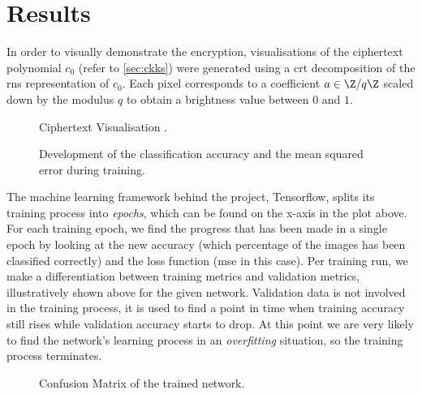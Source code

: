 \chapter{Results}
\label{chap:results}
In order to visually demonstrate the encryption, visualisations of the ciphertext polynomial $c_0$ (refer to \autoref{sec:ckks}) were generated using a \gls{crt} decomposition of the \gls{rns} representation of $c_0$.
Each pixel corresponds to a coefficient $a \in \Z / q\Z$ scaled down by the modulus $q$ to obtain a brightness value between $0$ and $1$.

\begin{figure}[H]
  \centering
  \caption{Ciphertext Visualisation .}
  \label{fig:ciphertext-visualisation}
\end{figure}

\begin{figure}[H]
  \centering
  \pgfplotsset{/pgfplots/group/.cd,vertical sep=1.6cm}
  \caption{Development of the classification accuracy and the mean squared error during training.}
  \label{fig:training-history}
\end{figure}

The machine learning framework behind the project, Tensorflow, splits its training process into \textit{epochs}, which can be found on the x-axis in the plot above.
For each training epoch, we find the progress that has been made in a single epoch by looking at the new accuracy (which percentage of the images has been classified correctly) and the loss function (\gls{mse} in this case).
Per training run, we make a differentiation between training metrics and validation metrics, illustratively shown above for the given network.
Validation data is not involved in the training process, it is used to find a point in time when training accuracy still rises while validation accuracy starts to drop.
At this point we are very likely to find the network's learning process in an \textit{overfitting} situation, so the training process terminates.

\begin{figure}[H]
  \centering
  \caption{Confusion Matrix of the trained network. }
  \label{fig:confusion-matrix}
\end{figure}

